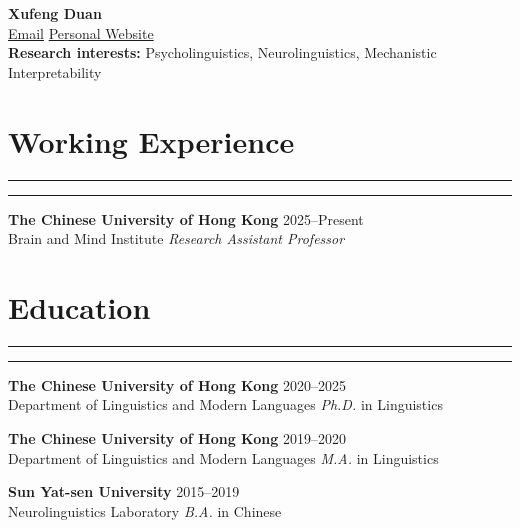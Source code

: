 \documentclass[11pt,a4paper]{article}
\begin{document}
\begin{center}
    {\Large \textbf{Xufeng Duan}}\\[6pt]
    \href{mailto:xufengduan@cuhk.edu.hk}{Email}  \quad 
    \href{https://xufengduan.github.io/}{Personal Website}\\
\textbf{Research interests:} Psycholinguistics, Neurolinguistics, Mechanistic Interpretability
\end{center}

\section*{Working Experience}
\vspace{-.5em}
\hrule
\vspace{0.3ex}
\hrule

\textbf{The Chinese University of Hong Kong} \hfill 2025--Present\\
Brain and Mind Institute \hfill \textit{Research Assistant Professor}

\vspace{-1.5em} 
\section*{Education}
\vspace{-.5em} 
\hrule
\vspace{0.3ex}
\hrule
\textbf{The Chinese University of Hong Kong} \hfill 2020--2025\\
Department of Linguistics and Modern Languages \hfill \textit{Ph.D.} in Linguistics


\textbf{The Chinese University of Hong Kong} \hfill 2019--2020\\
Department of Linguistics and Modern Languages \hfill \textit{M.A.} in Linguistics

\textbf{Sun Yat-sen University} \hfill 2015--2019\\
Neurolinguistics Laboratory \hfill \textit{B.A.} in Chinese
\end{document}
